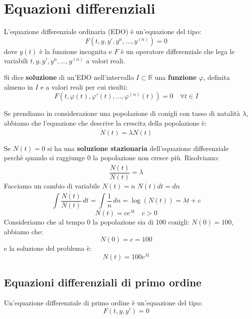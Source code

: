\documentclass[a4paper]{article}
\begin{document}


\tableofcontents
\pagebreak

\section{Equazioni differenziali}
L'equazione differenziale ordinaria (EDO) è un'equazione del tipo:
\[
  F(t, y, y', y^n, \ldots, y^{(n)}) = 0
\] 
dove \( y(t) \) è la funzione incognita e \( F \) è un operatore differenziale che lega le
variabili \( t, y, y', y^n, \ldots, y^{(n)} \) a valori reali.

Si dice \textbf{soluzione} di un'EDO nell'intervallo \( I \subset \mathbb{R} \) una
\textbf{funzione} \( \varphi  \), definita almeno in \( I \) 
e a valori reali per cui risulti:
\[
  F(t, \varphi(t), \varphi'(t), \ldots, \varphi^{(n)}(t)) = 0 \quad \forall t \in I
\] 

\begin{example}
  Se prendiamo in considerazione una popolazione di conigli con tasso di natalità
  \( \lambda \), abbiamo che l'equazione che descrive la crescita della popolazione
  è:
  \[
    \dot{N}(t) = \lambda N(t)
  \] 

  \vspace{1em}
  \noindent
  Se \( N(t) = 0 \) si ha una \textbf{soluzione stazionaria} dell'equazione differenziale
  perchè quando si raggiunge 0 la popolazione non cresce più. Risolviamo:
  \[
    \frac{\dot{N(t)}}{N(t)} = \lambda
  \] 
  Facciamo un cambio di variabile \( N(t) = n \) \( \dot{N(t)}dt = dn \) 
  \[
  \int \frac{\dot{N(t)}}{N(t)} \, dt = \int \frac{1}{n} \, dn = \log(N(t)) = \lambda t + c
  \] 
  \[
    N(t) = c e^{\lambda t} \quad c > 0
  \] 
  Consideriamo che al tempo 0 la popolazione sia di 100 conigli: \( N(0) = 100 \),
  abbiamo che:
  \[
  N(0) = c = 100
  \] 
  e la soluzione del problema è:
  \[
    N(t) = 100 e^{\lambda t}
  \] 
\end{example}

\subsection{Equazioni differenziali di primo ordine}
Un'equazione differenziale di primo ordine è un'equazione del tipo:
\[
  F(t,y,y') = 0
\] 
\end{document}
